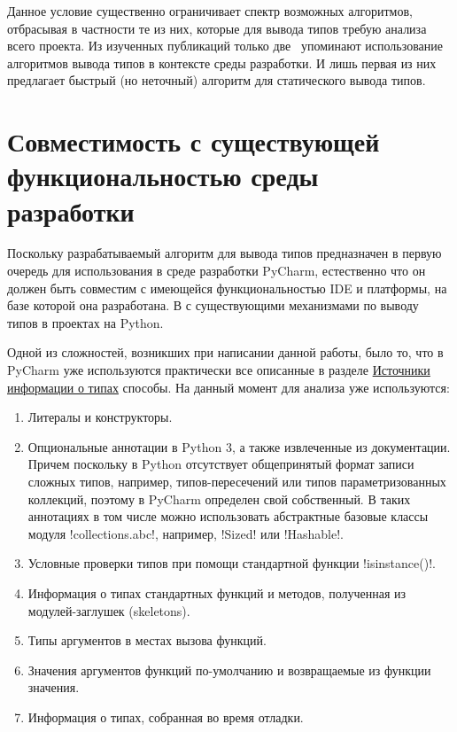 Данное условие существенно ограничивает спектр возможных алгоритмов, отбрасывая
в частности те из них, которые для вывода типов требую анализа всего проекта. Из
 изученных публикаций только две~\cite{Pluquet2009,Haupt2011} упоминают
использование алгоритмов вывода типов в контексте среды разработки. И лишь
первая из них предлагает быстрый (но неточный) алгоритм для статического вывода типов.

\section{Совместимость с существующей функциональностью среды разработки}

Поскольку разрабатываемый алгоритм для вывода типов предназначен в первую
очередь для использования в среде разработки PyCharm, естественно что он должен
быть совместим с имеющейся функциональностью IDE и платформы, на базе которой
она разработана. В с существующими механизмами по выводу типов в проектах на
Python. 

Одной из сложностей, возникших при написании данной работы, было то, что в
PyCharm уже используются практически все описанные в разделе
\hyperref[sec:type-sources]{Источники информации о типах} способы. На данный
момент для анализа уже используются:

\begin{enumerate}
    \item{%
        Литералы и конструкторы.
      }
    \item{%
        Опциональные аннотации в Python 3, а также извлеченные из
        документации. Причем поскольку в Python отсутствует общепринятый формат
        записи сложных типов, например, типов-пересечений или типов
        параметризованных коллекций, поэтому в PyCharm определен свой собственный.
        В таких аннотациях в том числе можно использовать абстрактные базовые
        классы модуля !collections.abc!, например, !Sized! или !Hashable!.
    }
    \item{%
        Условные проверки типов при помощи стандартной функции !isinstance()!.
      }
    \item{%
        Информация о типах стандартных функций и методов, полученная из
        модулей-заглушек (skeletons).
      }
    \item{%
        Типы аргументов в местах вызова функций.
      }
    \item{%
        Значения аргументов функций по-умолчанию и возвращаемые из функции
        значения.
      }
    \item{%
        Информация о типах, собранная во время отладки.
      }
\end{enumerate}

